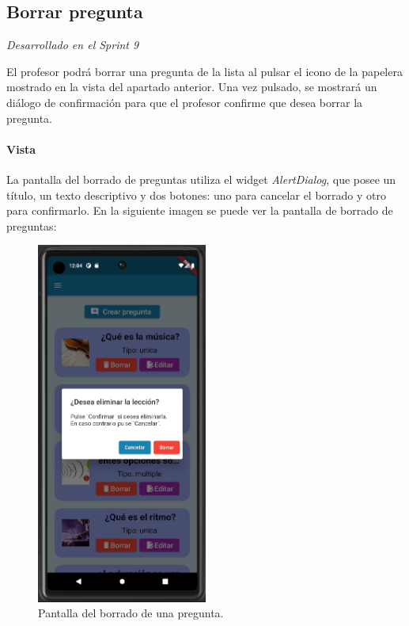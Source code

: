 \newpage
\subsection{Borrar pregunta} 

\textit{Desarrollado en el Sprint 9}

El profesor podrá borrar una pregunta de la lista al pulsar el icono de la papelera mostrado en la vista del apartado anterior. Una vez pulsado, se mostrará un diálogo de confirmación para que el profesor confirme que desea borrar la pregunta.

\paragraph*{Vista}
La pantalla del borrado de preguntas utiliza el widget \textit{AlertDialog}, que posee
un título, un texto descriptivo y dos botones: uno para cancelar el borrado y otro para confirmarlo.
En la siguiente imagen se puede ver la pantalla de borrado de preguntas:


\begin{figure}[H]
  \centering
  \includegraphics[width=0.5\textwidth]{imagenes/c7/borrarpregunta.png}
  \caption{Pantalla del borrado de una pregunta.} 
  \label{fig:borradopregunta}
\end{figure}

